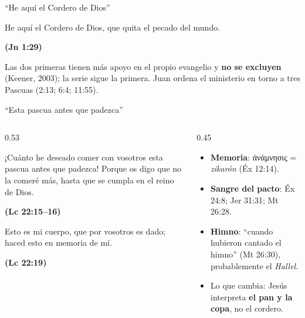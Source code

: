 \documentclass[hyperref={bookmarks=false},aspectratio=169]{beamer}
\newcommand{\grc}[1]{\foreignlanguage{ancientgreek}{#1}}
\newcommand{\fuente}[1]{\par\hfill{\upshape\bfseries\footnotesize\textcolor{tierraroja}{#1}}}
\newcommand{\destacar}[1]{\textbf{\textcolor{tierraroja}{#1}}}
\begin{document}
\begin{frame}{``He aquí el Cordero de Dios''}
\begin{cita}He aquí el Cordero de Dios, que quita el pecado del mundo.\fuente{(Jn 1:29)}\end{cita}
\centering
{}\par\medskip
\small\RaggedRight Las dos primeras tienen más apoyo en el propio evangelio y \destacar{no se excluyen} (Keener, 2003); la serie sigue la primera. Juan ordena el ministerio en torno a tres Pascuas (2:13; 6:4; 11:55).
\end{frame}

\begin{frame}{``Esta pascua antes que padezca''}
\begin{columns}[c,onlytextwidth]
\begin{column}{0.53\textwidth}
\begin{cita}¡Cuánto he deseado comer con vosotros esta pascua antes que padezca! Porque os digo que no la comeré más, hasta que se cumpla en el reino de Dios.\fuente{(Lc 22:15--16)}\end{cita}
\begin{cita}Esto es mi cuerpo, que por vosotros es dado; haced esto en memoria de mí.\fuente{(Lc 22:19)}\end{cita}
\end{column}
\begin{column}{0.45\textwidth}\small
\begin{itemize}
\item \destacar{Memoria}: \grc{ἀνάμνησις} = \emph{zikarón} (Éx 12:14).
\item \destacar{Sangre del pacto}: Éx 24:8; Jer 31:31; Mt 26:28.
\item \destacar{Himno}: ``cuando hubieron cantado el himno'' (Mt 26:30), probablemente el \emph{Hallel}.
\item Lo que cambia: Jesús interpreta \destacar{el pan y la copa}, no el cordero.
\end{itemize}
\end{column}
\end{columns}
\end{frame}
\end{document}
